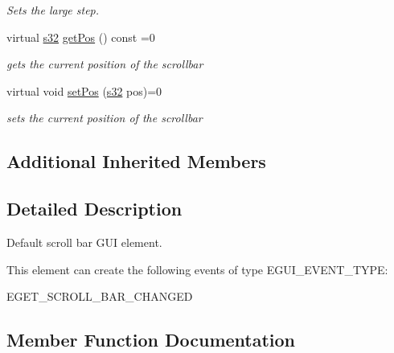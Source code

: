 \begin{DoxyCompactItemize}
\begin{DoxyCompactList}\small\item\em Sets the large step. \end{DoxyCompactList}\item 
\mbox{\label{classirr_1_1gui_1_1IGUIScrollBar_ad11122ee5eafc429c4e1b7710514f90b}} 
virtual \hyperlink{namespaceirr_ac66849b7a6ed16e30ebede579f9b47c6}{s32} \hyperlink{classirr_1_1gui_1_1IGUIScrollBar_ad11122ee5eafc429c4e1b7710514f90b}{get\+Pos} () const =0
\begin{DoxyCompactList}\small\item\em gets the current position of the scrollbar \end{DoxyCompactList}\item 
\mbox{\label{classirr_1_1gui_1_1IGUIScrollBar_a62609bf3b076a16afeb6e67072a8ea13}} 
virtual void \hyperlink{classirr_1_1gui_1_1IGUIScrollBar_a62609bf3b076a16afeb6e67072a8ea13}{set\+Pos} (\hyperlink{namespaceirr_ac66849b7a6ed16e30ebede579f9b47c6}{s32} pos)=0
\begin{DoxyCompactList}\small\item\em sets the current position of the scrollbar \end{DoxyCompactList}\end{DoxyCompactItemize}
\subsection*{Additional Inherited Members}


\subsection{Detailed Description}
Default scroll bar G\+UI element. 

\begin{DoxyParagraph}{This element can create the following events of type E\+G\+U\+I\+\_\+\+E\+V\+E\+N\+T\+\_\+\+T\+Y\+PE\+:}
\begin{DoxyItemize}
\item E\+G\+E\+T\+\_\+\+S\+C\+R\+O\+L\+L\+\_\+\+B\+A\+R\+\_\+\+C\+H\+A\+N\+G\+ED \end{DoxyItemize}

\end{DoxyParagraph}


\subsection{Member Function Documentation}
\mbox{\label{classirr_1_1gui_1_1IGUIScrollBar_a2872ee4bc49bb26c979b4c891c567ab2}} 
